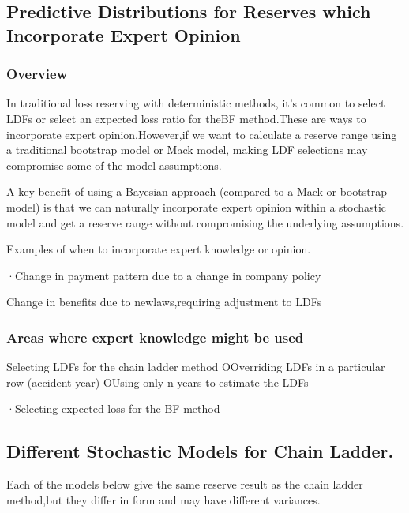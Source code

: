\documentclass[
]{article}
\begin{document}
\subsection{Predictive Distributions for Reserves which Incorporate
Expert
Opinion}\label{predictive-distributions-for-reserves-which-incorporate-expert-opinion}

\subsubsection{Overview}\label{overview-11}

In traditional loss reserving with deterministic methods, it's common to
select LDFs or select an expected loss ratio for theBF method.These are
ways to incorporate expert opinion.However,if we want to calculate a
reserve range using a traditional bootstrap model or Mack model, making
LDF selections may compromise some of the model assumptions.

A key benefit of using a Bayesian approach (compared to a Mack or
bootstrap model) is that we can naturally incorporate expert opinion
within a stochastic model and get a reserve range without compromising
the underlying assumptions.

Examples of when to incorporate expert knowledge or opinion.

·Change in payment pattern due to a change in company policy

Change in benefits due to newlaws,requiring adjustment to LDFs

\subsubsection{Areas where expert knowledge might be
used}\label{areas-where-expert-knowledge-might-be-used}

Selecting LDFs for the chain ladder method OOverriding LDFs in a
particular row (accident year) OUsing only n-years to estimate the LDFs

·Selecting expected loss for the BF method

\subsection{Different Stochastic Models for Chain
Ladder.}\label{different-stochastic-models-for-chain-ladder.}

Each of the models below give the same reserve result as the chain
ladder method,but they differ in form and may have different variances.
\end{document}
